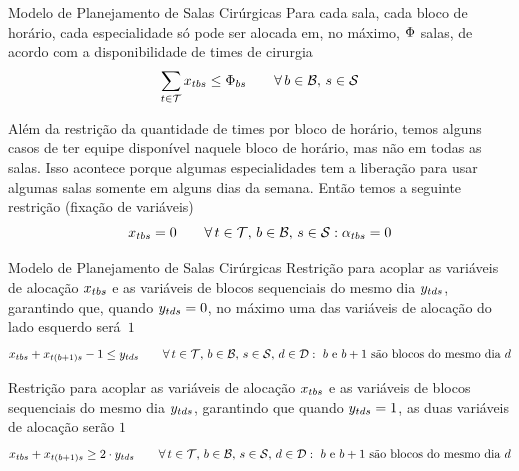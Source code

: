 \documentclass[10pt]{beamer}
\begin{document}
\begin{frame}{Modelo de Planejamento de Salas Cirúrgicas}
    Para cada sala, cada bloco de horário, cada especialidade só pode ser alocada em, no máximo, $\Phi$ salas, de acordo com a disponibilidade de times de cirurgia
    \begin{equation}
    \label{eq:m2-6}
        \sum_{t \in \mathcal{T}} x_{tbs} \leq \Phi_{bs} \hspace{2em} \forall\, b \in \mathcal{B},\, s \in \mathcal{S}
    \end{equation}
    
    Além da restrição da quantidade de times por bloco de horário, temos alguns casos de ter equipe disponível naquele bloco de horário, mas não em todas as salas. Isso acontece porque algumas especialidades tem a liberação para usar algumas salas somente em alguns dias da semana. Então temos a seguinte restrição (fixação de variáveis)
    \begin{equation}
    \label{eq:m2-7}
        x_{tbs} = 0 \hspace{2em} \forall\, t \in \mathcal{T},\,b \in \mathcal{B},\, s \in \mathcal{S} : \alpha_{tbs} = 0
    \end{equation}
\end{frame}
   

\begin{frame}{Modelo de Planejamento de Salas Cirúrgicas}
    Restrição para acoplar as variáveis de alocação $x_{tbs}$ e as variáveis de blocos sequenciais do mesmo dia $y_{tds}$, garantindo que, quando $y_{tds} = 0$, no máximo uma das variáveis de alocação do lado esquerdo será~$1$
    \begin{equation}
    \label{eq:m2-8}
        x_{tbs} + x_{t(b+1)s} - 1 \leq y_{tds} \hspace{2em} \forall\, t \in \mathcal{T},\, b \in \mathcal{B},\,s \in \mathcal{S},\, d \in \mathcal{D} : \text{ $b$ e $b+1$ são blocos do mesmo dia $d$}
    \end{equation}
    
    Restrição para acoplar as variáveis de alocação $x_{tbs}$ e as variáveis de blocos sequenciais do mesmo dia $y_{tds}$, garantindo que quando $y_{tds} = 1$, as duas variáveis de alocação serão $1$
    \begin{equation}
    \label{eq:m2-9}
        x_{tbs} + x_{t(b+1)s} \geq 2 \cdot y_{tds} \hspace{2em} \forall\, t \in \mathcal{T},\, b \in \mathcal{B},\,s \in \mathcal{S},\, d \in \mathcal{D} : \text{ $b$ e $b+1$ são blocos do mesmo dia $d$}
    \end{equation}
\end{frame}
\end{document}
